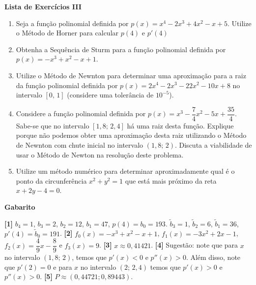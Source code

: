 \documentclass[12pt,a4paper]{article}
\begin{document}
\begin{center}
 \textbf{Lista de Exercícios III}
\end{center}

\begin{enumerate}
 \item Seja a função polinomial definida por $p(x) = x^4 - 2x^3 + 4x^2 - x + 5$. Utilize o Método de Horner para calcular $p(4)$ e $p'(4)$
 \item Obtenha a Sequência de Sturm para a função polinomial definida por $p(x) = -x^3 + x^2 - x + 1$.
 \item Utilize o Método de Newnton para determinar uma aproximação para a raiz da função polinomial definida por $p(x) = 2x^4 -2x^3 -22x^2 - 10x + 8$ no intervalo $[0,\,1]$ (considere uma tolerância 
 de $10^{-5}$).
 \item Considere a função polinomial definida por $p(x) = x^3 -\dfrac{7}{4}x^2 - 5x + \dfrac{35}{4}$. Sabe-se que no intervalo $[1,8;\,2,4]$ há uma raiz desta função. 
 Explique porque não podemos obter uma aproximação desta raiz utilizando o Método de Newnton com chute inicial no intervalo $(1,8;\,2)$. Discuta a viabilidade de usar o Método de Newton na resolução deste problema.
 \item Utilize um método numérico para determinar aproximadamente qual é o ponto da circunferência $x^2 + y^2 = 1$ que está mais próximo da reta $x + 2y - 4 = 0$.
 
\end{enumerate}

\begin{center}
\textbf{Gabarito}
\end{center} 
\textbf{[1]} $b_4 = 1$, $b_3 = 2$, $b_2 = 12$, $b_1 = 47$, $p(4) = b_0 = 193$. $\tilde{b}_3 = 1$, $\tilde{b}_2 = 6$, $\tilde{b}_1 = 36$, $p'(4) = \tilde{b}_0 = 191$. 
\textbf{[2]} $f_0(x) = -x^3 + x^2 - x + 1$, $f_1(x) = -3x^2 + 2x - 1$, $f_2(x) = \dfrac{4}{9}x-\dfrac{8}{9}$ e $f_3(x) = 9$.
\textbf{[3]} $x\approx 0,41421$. 
\textbf{[4]} Sugestão: note que para $x$ no intervalo $(1,8;\,2)$, temos que $p'(x) < 0$ e $p''(x) > 0$. Além disso, note que $p'(2)=0$ e para $x$ no intervalo $(2;\,2,4)$ temos que $p'(x) > 0$ e $p''(x) > 0$.
\textbf{[5]} $P\approx (0,44721; 0,89443)$. 
\end{document}
